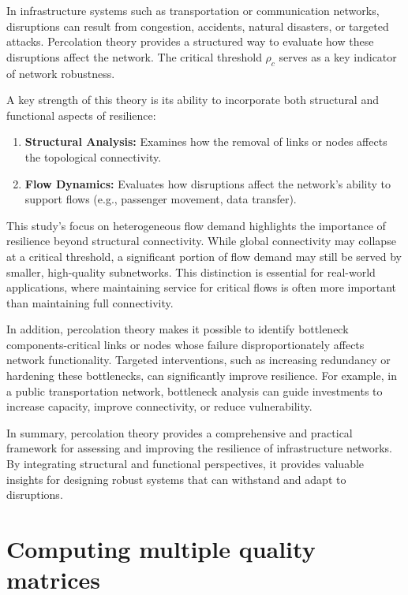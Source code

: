 \documentclass[
  letterpaper,
  DIV=11,
  numbers=noendperiod]{scrartcl}
\providecommand{\tightlist}{%
  \setlength{\itemsep}{0pt}\setlength{\parskip}{0pt}}\usepackage{longtable,booktabs,array}
\begin{document}
In infrastructure systems such as transportation or communication
networks, disruptions can result from congestion, accidents, natural
disasters, or targeted attacks. Percolation theory provides a structured
way to evaluate how these disruptions affect the network. The critical
threshold \(\rho_c\) serves as a key indicator of network robustness.

A key strength of this theory is its ability to incorporate both
structural and functional aspects of resilience:

\begin{enumerate}
\def\labelenumi{\arabic{enumi}.}
\tightlist
\item
  \textbf{Structural Analysis:} Examines how the removal of links or
  nodes affects the topological connectivity.
\item
  \textbf{Flow Dynamics:} Evaluates how disruptions affect the network's
  ability to support flows (e.g., passenger movement, data transfer).
\end{enumerate}

This study's focus on heterogeneous flow demand highlights the
importance of resilience beyond structural connectivity. While global
connectivity may collapse at a critical threshold, a significant portion
of flow demand may still be served by smaller, high-quality subnetworks.
This distinction is essential for real-world applications, where
maintaining service for critical flows is often more important than
maintaining full connectivity.

In addition, percolation theory makes it possible to identify bottleneck
components-critical links or nodes whose failure disproportionately
affects network functionality. Targeted interventions, such as
increasing redundancy or hardening these bottlenecks, can significantly
improve resilience. For example, in a public transportation network,
bottleneck analysis can guide investments to increase capacity, improve
connectivity, or reduce vulnerability.

In summary, percolation theory provides a comprehensive and practical
framework for assessing and improving the resilience of infrastructure
networks. By integrating structural and functional perspectives, it
provides valuable insights for designing robust systems that can
withstand and adapt to disruptions.

\section{Computing multiple quality
matrices}\label{computing-multiple-quality-matrices}
\end{document}
